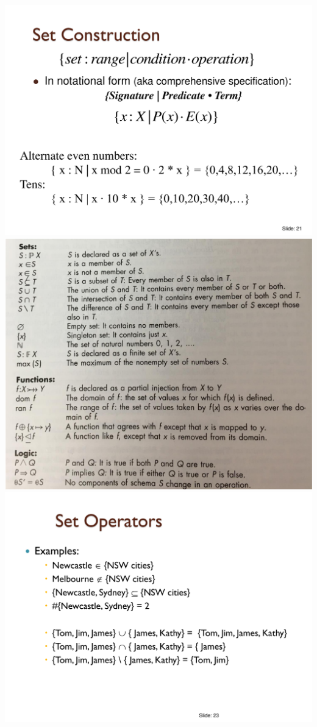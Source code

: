 \documentclass[a4paper]{article}
\begin{document}
\begin{multicols}{3}
        \includegraphics[width=\linewidth]{453.pdf}\\
        \includegraphics[width=\linewidth]{454.png}\\
        \includegraphics[width=\linewidth]{455.pdf}\\

\end{multicols}
\end{document}
